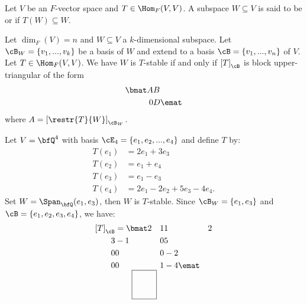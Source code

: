     \begin{definition}
        Let $V$ be an $F$-vector space and $T \in \Hom_F{(V,V)}$. A subspace $W \subseteq V$ is said to be  or  if $T(W) \subseteq W$.
    \end{definition}

    \begin{theorem}
        Let $\dim_F{(V)} = n$ and $W \subseteq V$ a $k$-dimensional subspace. Let $\cB_W = \{v_1,...,v_k\}$ be a basis of $W$ and extend to a basis $\cB = \{v_1,...,v_n\}$ of $V$. Let $T \in \Hom_F{(V,V)}$. We have $W$ is $T$-stable if and only if $\left[T\right]_\cB$ is block upper-triangular of the form
            \begin{equation*}
            \begin{split}
                \bmat A & B \\ 0& D \emat
            \end{split}
            \end{equation*}
        where $A = \left[\restr{T}{W}\right]_{\cB_W}$.
    \end{theorem}

    \begin{example}
        Let $V = \bfQ^4$ with basis $\cE_4 = \{e_1,e_2,...,e_4\}$ and define $T$ by:
            \begin{equation*}
            \begin{split}
                T(e_1) &= 2e_1 + 3e_3 \\
                T(e_2) &= e_1 + e_4 \\
                T(e_3) &= e_1 - e_3 \\
                T(e_4) &= 2e_1 - 2e_2 + 5e_3 - 4e_4.
            \end{split}
            \end{equation*}
        Set $W = \Span_\bfQ(e_1,e_3)$, then $W$ is $T$-stable. Since $\cB_W = \{e_1,e_3\}$ and $\cB = \{e_1,e_2,e_3,e_4\}$, we have:
            \begin{equation*}
            \begin{split}
                \left[T\right]_\cB
                &= \bmat 2 & 1 & 1 & 2 \\ 3 & -1 & 0 & 5 \\ 0 & 0 & 0 & -2 \\ 0 & 0 & 1 & -4 \emat
                \begin{tikzpicture}[overlay, remember picture]
                    \draw[gray, thick] (-1.85,-1.32) rectangle (-2.9,-0.1); %
                \end{tikzpicture}
            \end{split}
            \end{equation*}
    \end{example}

